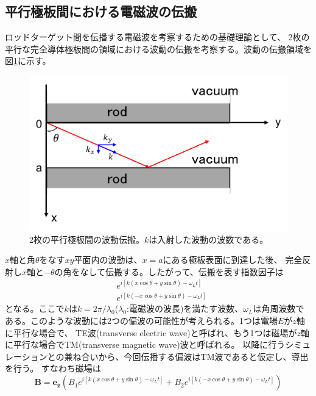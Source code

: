 \documentclass[a4paper,11pt,titlepage]{jsarticle}
\begin{document}
  \subsection{平行極板間における電磁波の伝搬}
  ロッドターゲット間を伝播する電磁波を考察するための基礎理論として、
  2枚の平行な完全導体極板間の領域における波動の伝搬を考察する。波動の伝搬領域を図\ref{fig:2-5_導波管}に示す。
  \begin{figure}[H]
    \begin{center}
      \includegraphics[scale=0.6]{./image/2-5/2-5_導波管.png}
      \caption{
        \label{fig:2-5_導波管}
        2枚の平行極板間の波動伝搬。$k$は入射した波動の波数である。
      }
    \end{center}
  \end{figure} 
  $x$軸と角$\theta$をなす$xy$平面内の波動は、$x=a$にある極板表面に到達した後、
  完全反射し$x$軸と$-\theta$の角をなして伝搬する。したがって、伝搬を表す指数因子は
  \begin{eqnarray}
    \label{eq:2-5-1}
    & e^{i[k(x \cos \theta + y \sin \theta ) - \omega_L t ] }  \nonumber \\
    & e^{i[k( - x \cos \theta + y \sin \theta ) - \omega_L t ] }
  \end{eqnarray}
  となる。ここで$k$は$k=2\pi/\lambda_0$($\lambda_0$:電磁波の波長)を満たす波数、$\omega_L$は角周波数である。このような波動には2つの偏波の可能性が考えられる。1つは電場$E$が$z$軸に平行な場合で、
  TE波(transverse electric wave)と呼ばれ、もう1つは磁場が$z$軸に平行な場合でTM(transverse magnetic wave)波と呼ばれる。
  以降に行うシミュレーションとの兼ね合いから、今回伝播する偏波はTM波であると仮定し、導出を行う。
  すなわち磁場は
  \begin{equation}
    \label{eq:2-5-2}
    \bm{B} = \bm{e_z} \left( B_1 e^{i[k(x \cos \theta + y \sin \theta ) - \omega_L t ] }
                  + B_2 e^{i[k(-x \cos \theta + y \sin \theta ) - \omega_L t ] }    \right)    
  \end{equation}
\end{document}
